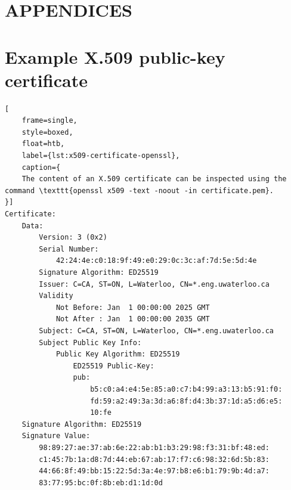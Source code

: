 \documentclass[letterpaper,12pt,titlepage,oneside,final]{book}
\begin{document}





\appendix
\chapter*{APPENDICES}

\chapter{Example X.509 public-key certificate}\label{sec:x509-certificate}
\begin{lstlisting}[
    frame=single, 
    style=boxed,
    float=htb,
    label={lst:x509-certificate-openssl}, 
    caption={
    The content of an X.509 certificate can be inspected using the command \texttt{openssl x509 -text -noout -in certificate.pem}.
}]
Certificate:
    Data:
        Version: 3 (0x2)
        Serial Number:
            42:24:4e:c0:18:9f:49:e0:29:0c:3c:af:7d:5e:5d:4e
        Signature Algorithm: ED25519
        Issuer: C=CA, ST=ON, L=Waterloo, CN=*.eng.uwaterloo.ca
        Validity
            Not Before: Jan  1 00:00:00 2025 GMT
            Not After : Jan  1 00:00:00 2035 GMT
        Subject: C=CA, ST=ON, L=Waterloo, CN=*.eng.uwaterloo.ca
        Subject Public Key Info:
            Public Key Algorithm: ED25519
                ED25519 Public-Key:
                pub:
                    b5:c0:a4:e4:5e:85:a0:c7:b4:99:a3:13:b5:91:f0:
                    fd:59:a2:49:3a:3d:a6:8f:d4:3b:37:1d:a5:d6:e5:
                    10:fe
    Signature Algorithm: ED25519
    Signature Value:
        98:89:27:ae:37:ab:6e:22:ab:b1:b3:29:98:f3:31:bf:48:ed:
        c1:45:7b:1a:d8:7d:44:eb:67:ab:17:f7:c6:98:32:6d:5b:83:
        44:66:8f:49:bb:15:22:5d:3a:4e:97:b8:e6:b1:79:9b:4d:a7:
        83:77:95:bc:0f:8b:eb:d1:1d:0d
\end{lstlisting}
\end{document}
